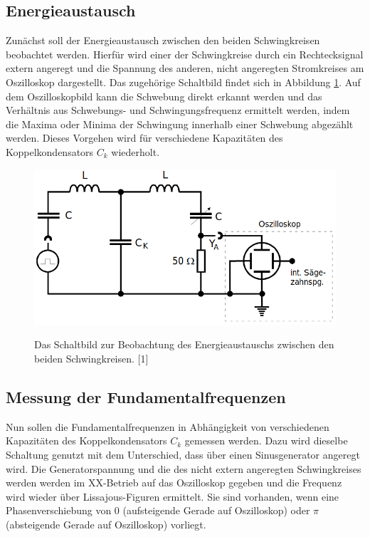 \documentclass[titlepage = firstcover]{scrartcl}
\begin{document}
    \subsection{Energieaustausch}
        Zunächst soll der Energieaustausch zwischen den beiden Schwingkreisen beobachtet werden. Hierfür wird einer der Schwingkreise durch ein Rechtecksignal
        extern angeregt und die Spannung des anderen, nicht angeregten Stromkreises am Oszilloskop dargestellt. Das zugehörige Schaltbild findet sich in 
        Abbildung \ref{fig:Energieaustausch}. Auf dem Oszilloskopbild kann die Schwebung direkt erkannt werden und das Verhältnis aus Schwebungs- und Schwingungsfrequenz ermittelt
        werden, indem die Maxima oder Minima der Schwingung innerhalb einer Schwebung abgezählt werden. Dieses Vorgehen wird für verschiedene Kapazitäten des
        Koppelkondensators $C_k$ wiederholt.
        \begin{figure}[h]
            \centering
            \caption{Das Schaltbild zur Beobachtung des Energieaustauschs zwischen den beiden Schwingkreisen. [1]}
            \includegraphics[width = 0.4\linewidth]{Energieaustausch.png}
            \label{fig:Energieaustausch}
        \end{figure}

    \subsection{Messung der Fundamentalfrequenzen}
          Nun sollen die Fundamentalfrequenzen in Abhängigkeit von verschiedenen Kapazitäten des Koppelkondensators $C_k$ gemessen werden. Dazu wird dieselbe Schaltung 
          genutzt mit dem Unterschied, dass über einen Sinusgenerator angeregt wird. Die Generatorspannung und die des nicht extern angeregten Schwingkreises werden
          werden im XX-Betrieb auf das Oszilloskop gegeben und die Frequenz wird wieder über Lissajous-Figuren ermittelt. Sie sind vorhanden, wenn eine 
          Phasenverschiebung von 0 (aufsteigende Gerade auf Oszilloskop) oder $\pi$ (absteigende Gerade auf Oszilloskop) vorliegt. 
          
\end{document}
